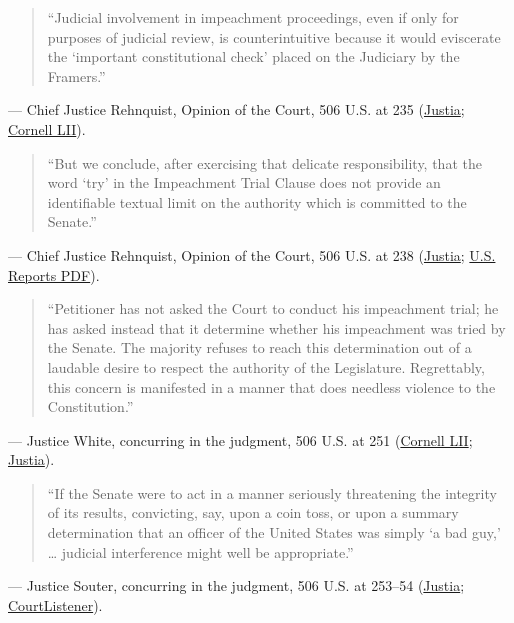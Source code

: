 \documentclass[12pt]{article}
\begin{document}
\begin{quote}
``Judicial involvement in impeachment proceedings, even if only for purposes of judicial review, is counterintuitive because it would eviscerate the `important constitutional check' placed on the Judiciary by the Framers.''
\end{quote}
\noindent --- Chief Justice Rehnquist, Opinion of the Court, 506 U.S. at 235 (\href{https://supreme.justia.com/cases/federal/us/506/224/}{Justia}; \href{https://www.law.cornell.edu/supct/html/91-740.ZO.html}{Cornell LII}).

\begin{quote}
``But we conclude, after exercising that delicate responsibility, that the word `try' in the Impeachment Trial Clause does not provide an identifiable textual limit on the authority which is committed to the Senate.''
\end{quote}
\noindent --- Chief Justice Rehnquist, Opinion of the Court, 506 U.S. at 238 (\href{https://supreme.justia.com/cases/federal/us/506/224/}{Justia}; \href{https://tile.loc.gov/storage-services/service/ll/usrep/usrep506/usrep506224/usrep506224.pdf}{U.S. Reports PDF}).

\begin{quote}
``Petitioner has not asked the Court to conduct his impeachment trial; he has asked instead that it determine whether his impeachment was tried by the Senate. The majority refuses to reach this determination out of a laudable desire to respect the authority of the Legislature. Regrettably, this concern is manifested in a manner that does needless violence to the Constitution.''
\end{quote}
\noindent --- Justice White, concurring in the judgment, 506 U.S. at 251 (\href{https://www.law.cornell.edu/supct/html/91-740.ZC1.html}{Cornell LII}; \href{https://supreme.justia.com/cases/federal/us/506/224/}{Justia}).

\begin{quote}
``If the Senate were to act in a manner seriously threatening the integrity of its results, convicting, say, upon a coin toss, or upon a summary determination that an officer of the United States was simply `a bad guy,' \dots{} judicial interference might well be appropriate.''
\end{quote}
\noindent --- Justice Souter, concurring in the judgment, 506 U.S. at 253--54 (\href{https://supreme.justia.com/cases/federal/us/506/224/}{Justia}; \href{https://www.courtlistener.com/opinion/112803/nixon-v-united-states/}{CourtListener}).
\end{document}

